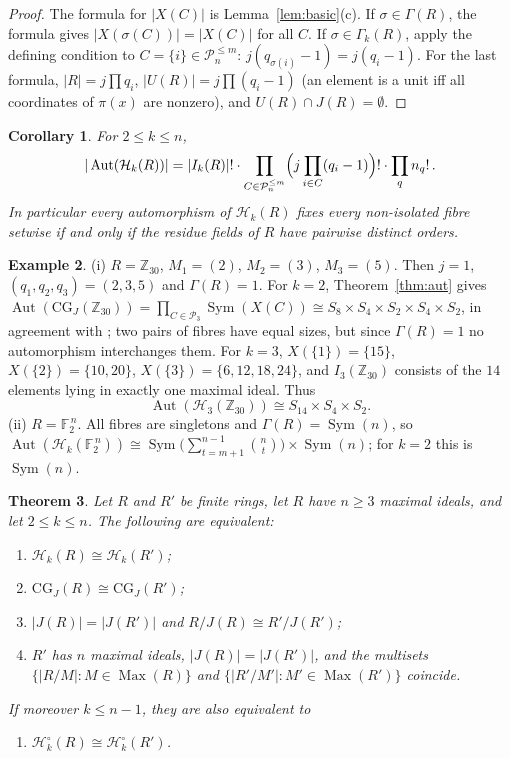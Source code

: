 \documentclass{amsart}
\newtheorem{theorem}{Theorem}[section]
\newtheorem{corollary}[theorem]{Corollary}
\theoremstyle{definition}
\newtheorem{example}[theorem]{Example}
\theoremstyle{remark}
\newcommand{\Max}{\operatorname{Max}}
\newcommand{\Aut}{\operatorname{Aut}}
\newcommand{\Sym}{\operatorname{Sym}}
\newcommand{\CG}{\mathrm{CG}_J}
\newcommand{\cP}{\mathcal{P}}
\newcommand{\cH}{\mathcal{H}}
\begin{document}
\begin{proof}
The formula for $|X(C)|$ is Lemma~\ref{lem:basic}(c). If $\sigma\in\Gamma(R)$, the formula gives $|X(\sigma(C))|=|X(C)|$ for all $C$. If $\sigma\in\Gamma_k(R)$, apply the defining condition to $C=\{i\}\in\cP_n^{\le m}$: $j(q_{\sigma(i)}-1)=j(q_i-1)$. For the last formula, $|R|=j\prod q_i$, $|U(R)|=j\prod(q_i-1)$ (an element is a unit iff all coordinates of $\pi(x)$ are nonzero), and $U(R)\cap J(R)=\emptyset$.
\end{proof}

\begin{corollary}\label{cor:order}
For $2\le k\le n$,
\[
|\Aut(\cH_k(R))|=|I_k(R)|!\cdot\prod_{C\in\cP_n^{\le m}}\Bigl(j\prod_{i\in C}(q_i-1)\Bigr)!\cdot\prod_q n_q!\,.
\]
In particular every automorphism of $\cH_k(R)$ fixes every non-isolated fibre setwise if and only if the residue fields of $R$ have pairwise distinct orders.
\end{corollary}

\begin{example}\label{ex:z30}
(i) $R=\mathbb Z_{30}$, $M_1=(2)$, $M_2=(3)$, $M_3=(5)$. Then $j=1$, $(q_1,q_2,q_3)=(2,3,5)$ and $\Gamma(R)=1$. For $k=2$, Theorem~\ref{thm:aut} gives $\Aut(\CG(\mathbb Z_{30}))=\prod_{C\in\cP_3}\Sym(X(C))\cong S_8\times S_4\times S_2\times S_4\times S_2$, in agreement with \cite[Example~3.11]{KMR25}; two pairs of fibres have equal sizes, but since $\Gamma(R)=1$ no automorphism interchanges them. For $k=3$, $X(\{1\})=\{15\}$, $X(\{2\})=\{10,20\}$, $X(\{3\})=\{6,12,18,24\}$, and $I_3(\mathbb Z_{30})$ consists of the $14$ elements lying in exactly one maximal ideal. Thus
\[
\Aut(\cH_3(\mathbb Z_{30}))\cong S_{14}\times S_4\times S_2 .
\]
(ii) $R=\mathbb F_2^{\,n}$. All fibres are singletons and $\Gamma(R)=\Sym(n)$, so $\Aut(\cH_k(\mathbb F_2^{\,n}))\cong\Sym\bigl(\sum_{t=m+1}^{n-1}\binom nt\bigr)\times\Sym(n)$; for $k=2$ this is $\Sym(n)$.
\end{example}

\begin{theorem}\label{thm:finiteiso}
Let $R$ and $R'$ be finite rings, let $R$ have $n\ge 3$ maximal ideals, and let $2\le k\le n$. The following are equivalent:
\begin{enumerate}
\item[(i)] $\cH_k(R)\cong\cH_k(R')$;
\item[(ii)] $\CG(R)\cong\CG(R')$;
\item[(iii)] $|J(R)|=|J(R')|$ and $R/J(R)\cong R'/J(R')$;
\item[(iv)] $R'$ has $n$ maximal ideals, $|J(R)|=|J(R')|$, and the multisets $\{|R/M|: M\in\Max(R)\}$ and $\{|R'/M'|: M'\in\Max(R')\}$ coincide.
\end{enumerate}
If moreover $k\le n-1$, they are also equivalent to
\begin{enumerate}
\item[(v)] $\cH_k^\circ(R)\cong\cH_k^\circ(R')$.
\end{enumerate}
\end{theorem}
\end{document}
